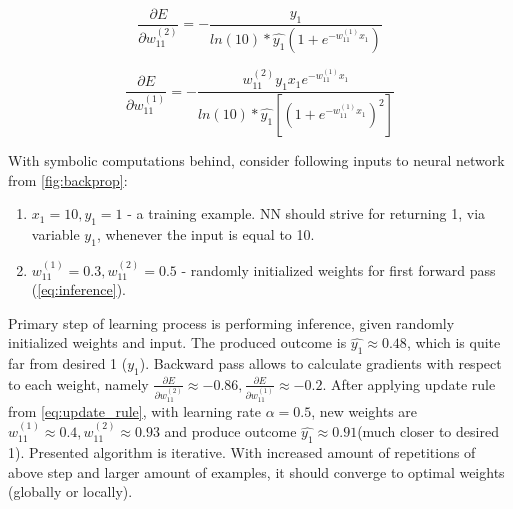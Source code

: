 \documentclass[11pt, a4paper]{article}
\begin{document}
\begin{equation} \label{eq:gradient_1}
\frac{\partial E}{\partial w_{11}^{(2)}} = - \frac{y_1}{ln(10) * \hat{y_1}(1 + e^{-w_{11}^{(1)}x_1})}
\end{equation}

\begin{equation} \label{eq:gradient_2}
\frac{\partial E}{\partial w_{11}^{(1)}} = - \frac{w_{11}^{(2)}y_1x_1e^{-w_{11}^{(1)}x_1}}{ln(10) * \hat{y_1}[(1 + e^{-w_{11}^{(1)}x_1})^2]}
\end{equation}

With symbolic computations behind, consider following inputs to neural network from \autoref{fig:backprop}:
\begin{enumerate}[1)]
\item $x_1=10, y_1=1$ - a training example. NN should strive for returning 1, via variable $y_1$, whenever the input is equal to 10.
\item $w_{11}^{(1)}=0.3, w_{11}^{(2)}=0.5$ - randomly initialized weights for first forward pass (\autoref{eq:inference}).
\end{enumerate}
Primary step of learning process is performing inference, given randomly initialized weights and input. The produced outcome is $\hat{y_1} \approx 0.48$, which is quite far from desired 1 ($y_1$). Backward pass allows to calculate gradients with respect to each weight, namely $\frac{\partial E}{\partial w_{11}^{(2)}} \approx -0.86,  \frac{\partial E}{\partial w_{11}^{(1)}} \approx -0.2$. After applying update rule from \autoref{eq:update_rule}, with learning rate $\alpha=0.5$, new weights are $w_{11}^{(1)} \approx 0.4, w_{11}^{(2)} \approx 0.93$ and produce outcome $\hat{y_1} \approx 0.91$(much closer to desired 1). Presented algorithm is iterative. With increased amount of repetitions of above step and larger amount of examples, it should converge to optimal weights (globally or locally).
\clearpage
\end{document}
